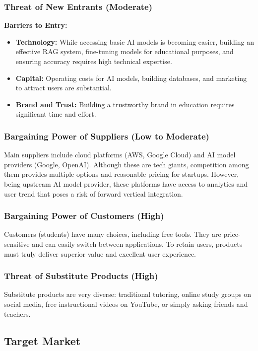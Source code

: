 \subsubsection{Threat of New Entrants (Moderate)}
\textbf{Barriers to Entry:}
\begin{itemize}
    \item \textbf{Technology:} 
        While accessing basic AI models is becoming easier, building an effective RAG system, fine-tuning models for
        educational purposes, and ensuring accuracy requires high technical expertise.
    \item \textbf{Capital:} 
        Operating costs for AI models, building databases, and marketing to attract users are substantial.
    \item \textbf{Brand and Trust:}
        Building a trustworthy brand in education requires significant time and effort.
\end{itemize}

\subsubsection{Bargaining Power of Suppliers (Low to Moderate)}
Main suppliers include cloud platforms (AWS, Google Cloud) and AI model providers (Google, OpenAI). Although these are 
tech giants, competition among them provides multiple options and reasonable pricing for startups. However, being
upstream AI model provider, these platforms have access to analytics and user trend that poses a risk of forward
vertical integration.

\subsubsection{Bargaining Power of Customers (High)}
Customers (students) have many choices, including free tools. They are price-sensitive and can easily switch between 
applications. To retain users, products must truly deliver superior value and excellent user experience.

\subsubsection{Threat of Substitute Products (High)}
Substitute products are very diverse: traditional tutoring, online study groups on social media, free instructional 
videos on YouTube, or simply asking friends and teachers.

\subsection{Target Market}
